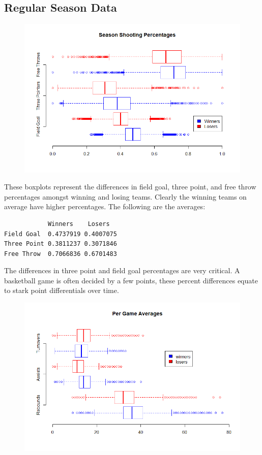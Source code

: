 \documentclass[]{scrartcl}
\begin{document}
\subsection*{Regular Season Data}
\begin{figure}[H]
	\centering
	\includegraphics[scale=.6]{SeasonShotPercent.png}
\end{figure}
These boxplots represent the differences in field goal, three point, and free throw percentages amongst winning and losing teams. Clearly the winning teams on average have higher percentages. The following are the averages:
\begin{verbatim}
            Winners    Losers
Field Goal  0.4737919 0.4007075
Three Point 0.3811237 0.3071846
Free Throw  0.7066836 0.6701483
\end{verbatim}
The differences in three point and field goal percentages are very critical. A basketball game is often decided by a few points, these percent differences equate to stark point differentials over time.
\begin{figure}[H]
	\centering
	\includegraphics[scale=.6]{GameAverages.png}
\end{figure}
\end{document}
